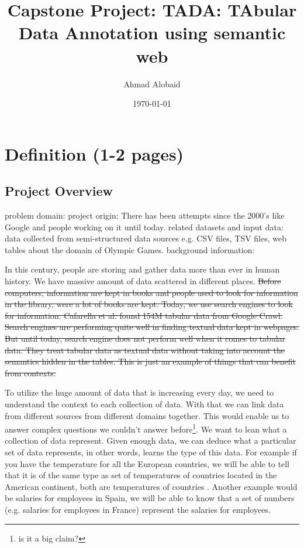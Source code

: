 \documentclass{article}
\title{Capstone Project: TADA: TAbular Data Annotation using semantic web}
\author{Ahmad Alobaid}
\date{\today}
\newcommand{\note}[2][inline]{\color{blue} #2 \color{black}}
\newcommand{\crossout}[2][inline]{\color{red}\st{#2}\color{black}}
\begin{document}
 
\maketitle
 
\tableofcontents

\clearpage
\section{Definition (1-2 pages)}

\subsection{Project Overview}
\note{problem domain:
project origin: There has been attempts since the 2000's like Google and people working on it until today.
related datasets and input data: data collected from semi-structured data sources e.g. CSV files, TSV files, web tables about the domain of Olympic Games.
background information: 

}

In this century, people are storing and gather data more than ever in human history. We have massive amount of data scattered in different places.\crossout{ Before computers, information are kept in books and people used to look for information in the library, were a lot of books are kept. Today, we use search engines to look for information. Cafarella et al. found 154M tabular data from Google Crawl}\cite{webtables-power-2008}\crossout{. Search engines are performing quite well in finding textual data kept in webpages. But until today, search engine does not perform well when it comes to tabular data. They treat tabular data as textual data without taking into account the semantics hidden in the tables. This is just an example of things that can benefit from contexts.}

To utilize the huge amount of data that is increasing every day, we need to understand the context to each collection of data. 
With that we can link data from different sources from different domains together. This would enable us to answer complex questions we couldn't answer before\footnote{is it a big claim?}.
We want to lean what a collection of data represent. Given enough data, we can deduce what a particular set of data represents, in other words, learns the type of this data. For example if you have the temperature for all the European countries, we will be able to tell that it is of the same type as set of temperatures of countries located in the American continent, both are temperatures of countries . Another example would be salaries for employees in Spain, we will be able to know that a set of numbers (e.g. salaries for employees in France) represent the salaries for employees. 
\end{document}
